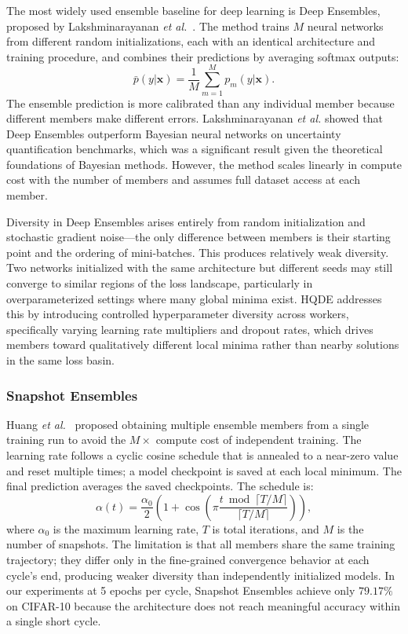 \documentclass[journal,twoside]{IEEEtran}
\newcommand{\hqde}{\mbox{HQDE}\xspace}
\newcommand{\etal}{\textit{et al.}\xspace}
\begin{document}
The most widely used ensemble baseline for deep learning is Deep
Ensembles, proposed by Lakshminarayanan \etal~\cite{lakshminarayanan2017}.
The method trains $M$ neural networks from different random
initializations, each with an identical architecture and training
procedure, and combines their predictions by averaging softmax outputs:
\begin{equation}
  \bar{p}(y|\mathbf{x}) = \frac{1}{M}\sum_{m=1}^{M} p_m(y|\mathbf{x}).
  \label{eq:de}
\end{equation}
The ensemble prediction is more calibrated than any individual member
because different members make different errors. Lakshminarayanan
\etal showed that Deep Ensembles outperform Bayesian neural
networks on uncertainty quantification benchmarks, which was a
significant result given the theoretical foundations of Bayesian
methods. However, the method scales linearly in compute cost with the
number of members and assumes full dataset access at each member.

Diversity in Deep Ensembles arises entirely from random initialization
and stochastic gradient noise---the only difference between members is
their starting point and the ordering of mini-batches. This produces
relatively weak diversity. Two networks initialized with the same
architecture but different seeds may still converge to similar
regions of the loss landscape, particularly in overparameterized
settings where many global minima exist. \hqde{} addresses this by
introducing controlled hyperparameter diversity across workers,
specifically varying learning rate multipliers and dropout rates,
which drives members toward qualitatively different local minima
rather than nearby solutions in the same loss basin.

\subsubsection{Snapshot Ensembles}

Huang \etal~\cite{huang2017snapshot} proposed obtaining multiple
ensemble members from a single training run to avoid the $M\times$
compute cost of independent training. The learning rate follows a
cyclic cosine schedule that is annealed to a near-zero value and reset
multiple times; a model checkpoint is saved at each local minimum. The
final prediction averages the saved checkpoints. The schedule is:
\begin{equation}
  \alpha(t) = \frac{\alpha_0}{2}\!\left(1 + \cos\!\left(\pi
  \frac{t \bmod \lceil T/M \rceil}{\lceil T/M \rceil}\right)\right)\!,
  \label{eq:snapshot}
\end{equation}
where $\alpha_0$ is the maximum learning rate, $T$ is total iterations,
and $M$ is the number of snapshots. The limitation is that all members
share the same training trajectory; they differ only in the fine-grained
convergence behavior at each cycle's end, producing weaker diversity
than independently initialized models. In our experiments at 5 epochs
per cycle, Snapshot Ensembles achieve only $79.17\%$ on CIFAR-10 because
the architecture does not reach meaningful accuracy within a single
short cycle.
\end{document}
